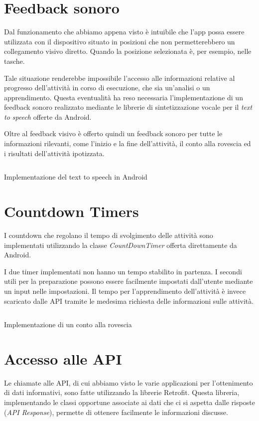 \section{Feedback sonoro}
Dal funzionamento che abbiamo appena visto è intuibile che l'app possa essere utilizzata con il dispositivo situato in posizioni che non permetterebbero
un collegamento visivo diretto. Quando la posizione selezionata è, per esempio, nelle tasche.

Tale situazione renderebbe impossibile l'accesso alle informazioni relative al progresso dell'attività in corso di esecuzione, che sia 
un'analisi o un apprendimento.
Questa eventualità ha reso necessaria l'implementazione di un feedback sonoro realizzato mediante le librerie 
di sintetizzazione vocale per il \textit{text to speech} \cite{tts} offerte da Android.

Oltre al feedback visivo è offerto quindi un feedback sonoro per tutte le informazioni rilevanti, come l'inizio e la fine dell'attività, 
il conto alla rovescia ed i risultati dell'attività ipotizzata.

\begin{listing}[H] 
    \inputminted[frame=single,framesep=10pt]{java}{assets/snippets/app/voice.java}
    \caption{Implementazione del text to speech in Android}
\end{listing}



\section{Countdown Timers}
I countdown che regolano il tempo di svolgimento delle attività sono implementati utilizzando la 
classe \textit{CountDownTimer} \cite{countdown} offerta direttamente da Android.

I due timer implementati non hanno un tempo stabilito in partenza. I secondi utili per la preparazione possono essere facilmente
impostati dall'utente mediante un input nelle impostazioni. Il tempo per l'apprendimento dell'attività è invece scaricato dalle API
tramite le medesima richiesta delle informazioni sulle attività.

\begin{listing}[H] 
    \inputminted[frame=single,framesep=10pt]{java}{assets/snippets/app/countdown.java}
    \caption{Implementazione di un conto alla rovescia}
\end{listing}



\section{Accesso alle API}
Le chiamate alle API, di cui abbiamo visto le varie applicazioni per l'ottenimento di dati informativi, 
sono fatte utilizzando la librerie Retrofit. Questa libreria, implementando le classi opportune associate ai dati
che ci si aspetta dalle risposte (\textit{API Response}), permette di ottenere facilmente le informazioni discusse.
